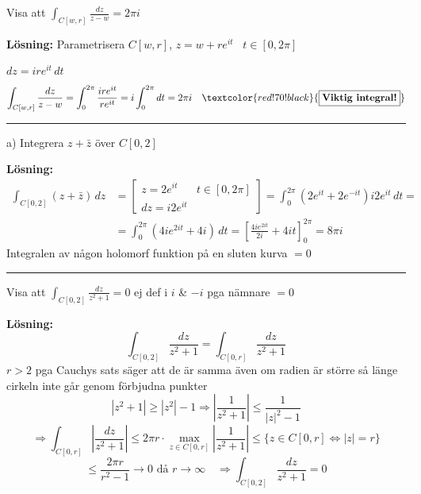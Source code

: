  \quad Visa att $\displaystyle\int_{C[w, r]} \frac{dz}{z - w} = 2\pi i$

\textbf{Lösning:} Parametrisera $C[w, r]$, $z = w + re^{it}$ \ $t \in [0, 2\pi]$

$dz = ire^{it}\,dt$
\[ \int_{C[w, r]} \frac{dz}{z - w} = \int_0^{2\pi} \frac{ire^{it}}{re^{it}} = i\int_0^{2\pi} dt = 2\pi i \quad \textcolor{red!70!black}{\fbox{\textbf{Viktig integral!}}} \]

\noindent\rule{\linewidth}{0.4pt}

 \quad a) Integrera $z + \bar{z}$ över $C[0, 2]$

\textbf{Lösning:}
\begin{align*}
  \int_{C[0, 2]} (z + \bar{z})\,dz &= \left[ \begin{array}{ll} z = 2e^{it} & t \in [0, 2\pi] \\ dz = i2e^{it} & \end{array} \right] = \int_0^{2\pi} (2e^{it} + 2e^{-it})i2e^{it}\,dt = \\
  &= \int_0^{2\pi} (4ie^{2it} + 4i)\,dt = \left[ \frac{4ie^{2it}}{2i} + 4it \right]_0^{2\pi} = 8\pi i
\end{align*}
\textcolor{magenta!80!black}{Integralen av någon holomorf funktion på en sluten kurva $= 0$}

\noindent\rule{\linewidth}{0.4pt}

 \quad Visa att $\displaystyle\int_{C[0, 2]} \frac{dz}{z^2 + 1} = 0$
\textcolor{magenta!80!black}{ej def i $i$ \& $-i$ pga nämnare $= 0$}

\textbf{Lösning:}
\[ \int_{C[0, 2]} \frac{dz}{z^2 + 1} = \int_{C[0, r]} \frac{dz}{z^2 + 1} \]
\textcolor{blue!60!black}{$r > 2$ pga Cauchys sats säger att de är samma även om radien är större så länge cirkeln inte går genom förbjudna punkter}
\[ |z^2 + 1| \ge |z^2| - 1 \Rightarrow \left| \frac{1}{z^2 + 1} \right| \le \frac{1}{|z|^2 - 1} \]
\[ \Rightarrow \int_{C[0, r]} \left| \frac{dz}{z^2 + 1} \right| \le 2\pi r \cdot \max_{z \in C[0, r]} \left| \frac{1}{z^2 + 1} \right| \le \big\{ z \in C[0, r] \Leftrightarrow |z| = r \big\} \]
\[ \le \frac{2\pi r}{r^2 - 1} \to 0 \text{ då } r \to \infty \quad \Rightarrow \int_{C[0, 2]} \frac{dz}{z^2 + 1} = 0 \]
